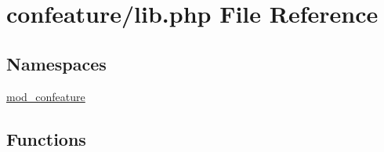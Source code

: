 \hypertarget{lib_8php}{\section{confeature/lib.php File Reference}
\label{lib_8php}
}
\subsection*{Namespaces}
\begin{DoxyCompactItemize}
\item 
\hyperlink{namespacemod__confeature}{mod\-\_\-confeature}
\end{DoxyCompactItemize}
\subsection*{Functions}
